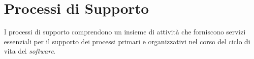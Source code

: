 \section{Processi di Supporto}
\label{sec:processi_supporto}

I processi di supporto comprendono un insieme di attività che forniscono
servizi essenziali per il supporto dei processi primari e organizzativi nel
corso del ciclo di vita del \textit{software}.









